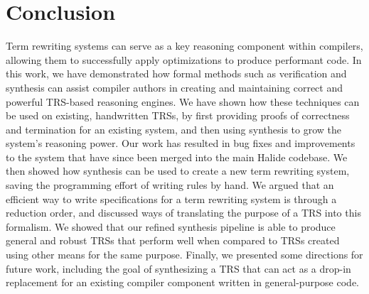 \section{Conclusion}

Term rewriting systems can serve as a key reasoning component within compilers, allowing them to successfully apply optimizations to produce performant code. In this work, we have demonstrated how formal methods such as verification and synthesis can assist compiler authors in creating and maintaining correct and powerful TRS-based reasoning engines. We have shown how these techniques can be used on existing, handwritten TRSs, by first providing proofs of correctness and termination for an existing system, and then using synthesis to grow the system's reasoning power. Our work has resulted in bug fixes and improvements to the system that have since been merged into the main Halide codebase. We then showed how synthesis can be used to create a new term rewriting system, saving the programming effort of writing rules by hand. We argued that an efficient way to write specifications for a term rewriting system is through a reduction order, and discussed ways of translating the purpose of a TRS into this formalism. We showed that our refined synthesis pipeline is able to produce general and robust TRSs that perform well when compared to TRSs created using other means for the same purpose. Finally, we presented some directions for future work, including the goal of synthesizing a TRS that can act as a drop-in replacement for an existing compiler component written in general-purpose code.
